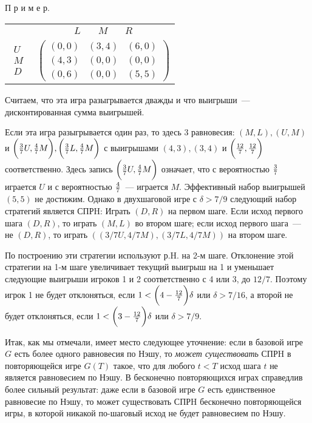 П р и м е р.%

\begin{center}
\begin{tabular}{cc}
&$\begin{array}{ccc} L\quad&M&\quad R\end{array}$\\
$\begin{array}{c} U\\M\\D\end{array}$&$(\begin{array}{ccc}
(0,0)&(3,4)&(6,0)\\
(4,3)&(0,0)&(0,0)\\
(0,6)&(0,0)&(5,5)\end{array})$\\
\end{tabular}
\end{center}

Считаем, что эта игра разыгрывается дважды и что выигрыши~---
дисконтированная сумма выигрышей.

Если эта игра разыгрывается один раз, то здесь 3 равновесия:
$(M,L),(U,M)$ и $\biggl({3\over 7}U,{4\over 7}M\biggr),\biggl({3\over
7}L,{4\over 7}M\biggr)$ с выигрышами $(4,3),(3,4)$ и
$\biggl({{12}\over 7},{{12}\over 7}\biggr)$ соответственно. Здесь
запись $\biggl({3\over 7}U,{4\over 7}M\biggr)$ означает, что с
вероятностью ${3\over 7}$ играется $U$ и с вероятностью ${4\over
7}$~--- играется $M$.  Эффективный набор выигрышей $(5,5)$ не
достижим. Однако в двухшаговой игре с $\delta>7/9$ следующий набор
стратегий является СПРH: Играть $(D,R)$ на первом шаге.  Если исход
первого шага $(D,R)$, то играть $(M,L)$ во втором шаге; если исход
первого шага~--- не $(D,R)$, то играть $((3/7U,4/7M),(3/7L,4/7M))$ на
втором шаге.

По построению эти стратегии используют р.H. на 2-м шаге.
Отклонение этой стратегии на 1-м шаге увеличивает текущий выигрыш на
1 и уменьшает следующие выигрыши игроков 1 и 2 соответственно с 4
или 3, до $12/7.$  Поэтому игрок 1 не будет отклоняться, если
$1<\biggl(4-{{12}\over 7}\biggr)\delta$ или $\delta>7/16$, а второй
не будет отклоняться, если $1<\biggl(3-{{12}\over 7}\biggr)\delta$
или $\delta>7/9$.

Итак, как мы отмечали, имеет место следующее уточнение: если в базовой
игре $G$ есть более одного равновесия по Нэшу, то \emph{может существовать} СПРH в
повторяющейся игре $G(T)$ такое, что для любого $t<T$ исход шага $t$
не является равновесием по Нэшу. В бесконечно повторяющихся играх
справедлив более сильный результат:  даже если в базовой игре
$G$ есть единственное  равновесие по Нэшу, то может существовать СПРH
бесконечно повторяющейся игры, в которой никакой по-шаговый
исход не будет равновесием по Нэшу.

